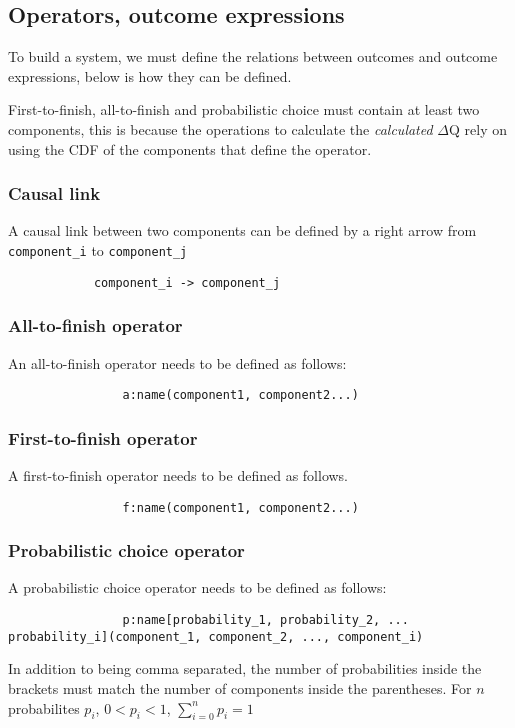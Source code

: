         \subsection{Operators, outcome expressions}
            To build a system, we must define the relations between outcomes and outcome expressions, below is how they can be defined. 

            First-to-finish, all-to-finish and probabilistic choice must contain at least two components, this is because the operations to calculate the \textit{calculated} $\Delta$Q rely on using the CDF of the components that define the operator.
            
        \subsubsection{Causal link}
            A causal link between two components can be defined by a right arrow from \texttt{component\_i} to \texttt{component\_j}
        \begin{verbatim}
            component_i -> component_j 
        \end{verbatim}
        
        \subsubsection{All-to-finish operator}
            An all-to-finish operator needs to be defined as follows:
            \begin{verbatim}
                a:name(component1, component2...)
            \end{verbatim}

        \subsubsection{First-to-finish operator}
            A first-to-finish operator needs to be defined as follows.
            \begin{verbatim}
                f:name(component1, component2...)
            \end{verbatim} 

        \subsubsection{Probabilistic choice operator}
            A probabilistic choice operator needs to be defined as follows:
            \begin{verbatim}
                p:name[probability_1, probability_2, ... probability_i](component_1, component_2, ..., component_i) 
            \end{verbatim}
            In addition to being comma separated, the number of probabilities inside the brackets must match the number of components inside the parentheses. For $n$ probabilites $p_i$, $0 < p_i < 1$, $\sum_{i = 0}^{n} p_i = 1$ 
        
